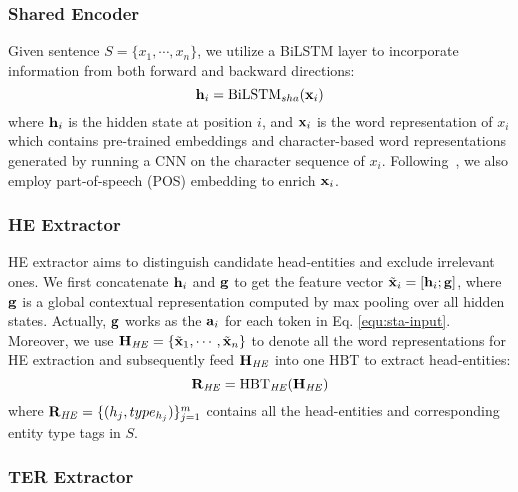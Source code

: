 \documentclass{ecai}
\begin{document}
\subsubsection{Shared Encoder} 
Given sentence $S=\{x_1,\cdots,x_n\}$, we utilize a BiLSTM layer to incorporate information from both forward and backward directions:
\begin{equation}
\label{equ:base-lstm}
   \boldsymbol{\rm{h}}_i = {\rm{BiLSTM}}_{sha}(\boldsymbol{\rm{x}}_i)
\end{equation}
where $\boldsymbol{\rm{h}}_i$ is the hidden state at position $i$, and $\boldsymbol{\rm{x}}_i$ is the word representation of $x_i$ which contains pre-trained embeddings and character-based word representations generated by running a CNN on the character sequence of $x_i$. 
 Following~\cite{fu-etal-2019-graphrel}, we also employ part-of-speech (POS) embedding to enrich $\boldsymbol{\rm{x}}_i$.



\subsubsection{HE Extractor}
HE extractor aims to distinguish candidate head-entities and exclude irrelevant ones. We first concatenate $\boldsymbol{\rm{h}}_i $ and $\boldsymbol{\rm{g}}$ to get the feature vector $\tilde{\boldsymbol{\rm{x}}}_i=[\boldsymbol{\rm{h}}_i;\boldsymbol{\rm{g}}]$, where $\boldsymbol{\rm{g}}$ is a global contextual representation computed by max pooling over all hidden states. 
Actually, $\boldsymbol{\rm{g}}$ works as the $\boldsymbol{\rm{a}}_i$ for each token in Eq. \ref{equ:sta-input}.
Moreover, we use $\boldsymbol{\rm{H}}_{\text{\emph{HE}}} = \{\tilde{\boldsymbol{\rm{x}}}_1, \cdots, \tilde{\boldsymbol{\rm{x}}}_n\}$ to denote all the word representations for HE extraction and subsequently feed $\boldsymbol{\rm{H}}_{\text{\emph{HE}}}$ into one HBT to extract head-entities:
\begin{equation}
   \mathbf{R}_{\text{\emph{HE}}} = {\rm{HBT}}_{\text{\emph{HE}}}(\boldsymbol{\rm{H}}_{\text{\emph{HE}}})
\end{equation} 
\noindent where  ${\mathbf{R}_{\text{\emph{HE}}}=\{(h_j,type_{h_j})\}_{j=1}^m}$  contains all the head-entities and corresponding entity type tags in $S$.

\subsubsection{TER Extractor} 
\end{document}
